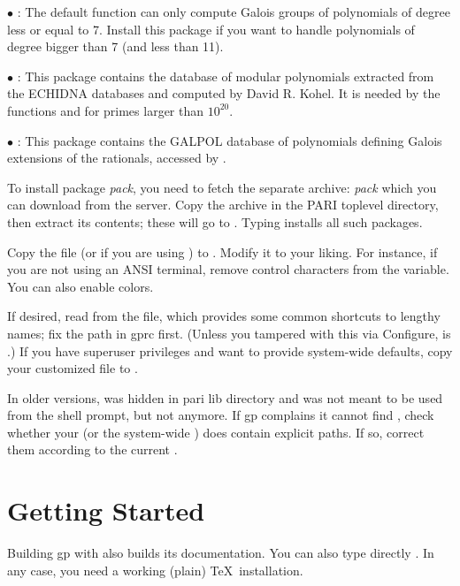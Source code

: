 $\bullet$ : The default  function can only
compute Galois groups of polynomials of degree less or equal to 7. Install
this package if you want to handle polynomials of degree bigger than 7 (and
less than 11).

$\bullet$ : This package contains the database of modular
polynomials extracted from the ECHIDNA databases and computed by David R.
Kohel. It is needed by the functions  and  for
primes larger than $10^{20}$.

$\bullet$ : This package contains the GALPOL database of polynomials
defining Galois extensions of the rationals, accessed by .

\medskip

To install package \emph{pack}, you need to fetch the separate archive:
\emph{pack} which you can download from the  server.
Copy the archive in the PARI toplevel directory, then extract its
contents; these will go to . Typing  installs all such packages.

 Copy the file  (or
 if you are using ) to . Modify
it to your liking. For instance, if you are not using an ANSI terminal,
remove control characters from the  variable. You can also
enable colors.

If desired, read   from the 
file, which provides some common shortcuts to lengthy names; fix the path in
gprc first. (Unless you tampered with this via Configure,  is
.) If you have superuser privileges and want to
provide system-wide defaults, copy your customized  file to
.

In older versions,  was hidden in pari lib directory and was not
meant to be used from the shell prompt, but not anymore. If gp complains it
cannot find , check whether your  (or the system-wide
) does contain explicit paths. If so, correct them according to the
current .

\section{Getting Started}

 Building gp with  also builds
its documentation. You can also type directly . In any case,
you need a working (plain) \TeX\ installation.

